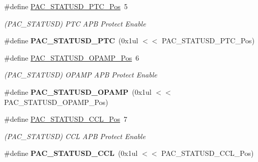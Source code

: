 \begin{DoxyCompactItemize}
\item 
\hypertarget{group___s_a_m_l21___p_a_c_ga75c193f61e9124293361d980d4387518}{}\#define \hyperlink{group___s_a_m_l21___p_a_c_ga75c193f61e9124293361d980d4387518}{P\+A\+C\+\_\+\+S\+T\+A\+T\+U\+S\+D\+\_\+\+P\+T\+C\+\_\+\+Pos}~5\label{group___s_a_m_l21___p_a_c_ga75c193f61e9124293361d980d4387518}

\begin{DoxyCompactList}\small\item\em (P\+A\+C\+\_\+\+S\+T\+A\+T\+U\+S\+D) P\+T\+C A\+P\+B Protect Enable \end{DoxyCompactList}\item 
\hypertarget{group___s_a_m_l21___p_a_c_ga1e8487fe34d84540d05c52529e9024d2}{}\#define {\bfseries P\+A\+C\+\_\+\+S\+T\+A\+T\+U\+S\+D\+\_\+\+P\+T\+C}~(0x1ul $<$$<$ P\+A\+C\+\_\+\+S\+T\+A\+T\+U\+S\+D\+\_\+\+P\+T\+C\+\_\+\+Pos)\label{group___s_a_m_l21___p_a_c_ga1e8487fe34d84540d05c52529e9024d2}

\item 
\hypertarget{group___s_a_m_l21___p_a_c_gaceebd0ab883b0c6d98dc6192e2f86d57}{}\#define \hyperlink{group___s_a_m_l21___p_a_c_gaceebd0ab883b0c6d98dc6192e2f86d57}{P\+A\+C\+\_\+\+S\+T\+A\+T\+U\+S\+D\+\_\+\+O\+P\+A\+M\+P\+\_\+\+Pos}~6\label{group___s_a_m_l21___p_a_c_gaceebd0ab883b0c6d98dc6192e2f86d57}

\begin{DoxyCompactList}\small\item\em (P\+A\+C\+\_\+\+S\+T\+A\+T\+U\+S\+D) O\+P\+A\+M\+P A\+P\+B Protect Enable \end{DoxyCompactList}\item 
\hypertarget{group___s_a_m_l21___p_a_c_ga60b9682c557aac09aa0e24d4f9d29e8c}{}\#define {\bfseries P\+A\+C\+\_\+\+S\+T\+A\+T\+U\+S\+D\+\_\+\+O\+P\+A\+M\+P}~(0x1ul $<$$<$ P\+A\+C\+\_\+\+S\+T\+A\+T\+U\+S\+D\+\_\+\+O\+P\+A\+M\+P\+\_\+\+Pos)\label{group___s_a_m_l21___p_a_c_ga60b9682c557aac09aa0e24d4f9d29e8c}

\item 
\hypertarget{group___s_a_m_l21___p_a_c_ga56d4ad26b2187b050def7767ffe92788}{}\#define \hyperlink{group___s_a_m_l21___p_a_c_ga56d4ad26b2187b050def7767ffe92788}{P\+A\+C\+\_\+\+S\+T\+A\+T\+U\+S\+D\+\_\+\+C\+C\+L\+\_\+\+Pos}~7\label{group___s_a_m_l21___p_a_c_ga56d4ad26b2187b050def7767ffe92788}

\begin{DoxyCompactList}\small\item\em (P\+A\+C\+\_\+\+S\+T\+A\+T\+U\+S\+D) C\+C\+L A\+P\+B Protect Enable \end{DoxyCompactList}\item 
\hypertarget{group___s_a_m_l21___p_a_c_ga5b0540330d06917c2acb08fdfcebc863}{}\#define {\bfseries P\+A\+C\+\_\+\+S\+T\+A\+T\+U\+S\+D\+\_\+\+C\+C\+L}~(0x1ul $<$$<$ P\+A\+C\+\_\+\+S\+T\+A\+T\+U\+S\+D\+\_\+\+C\+C\+L\+\_\+\+Pos)\label{group___s_a_m_l21___p_a_c_ga5b0540330d06917c2acb08fdfcebc863}


\end{DoxyCompactItemize}
